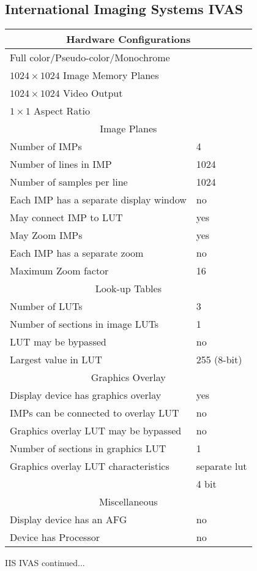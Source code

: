 \subsection{International Imaging Systems IVAS}
\begin{tabular}{|l l|}
\hline
\multicolumn{2}{|c|}{Hardware Configurations}\\
\hline
Full color/Pseudo-color/Monochrome & \\
$1024 \times 1024$ Image Memory Planes & \\
$1024 \times 1024$ Video Output & \\
$1 \times 1$ Aspect Ratio & \\ 
\hline \hline 
\multicolumn{2}{|c|}{Image Planes}\\ \hline
Number of IMPs & 4 \\
Number of lines in IMP & 1024\\
Number of samples per line & 1024\\
Each IMP has a separate display window & no\\
May connect IMP to LUT & yes\\
May Zoom IMPs & yes\\
Each IMP has a separate zoom & no\\
Maximum Zoom factor & 16\\
\hline \hline 
\multicolumn{2}{|c|}{Look-up Tables}\\ 
\hline
Number of LUTs & 3\\
Number of sections in image LUTs & 1\\
LUT may be bypassed & no\\
Largest value in LUT & 255 (8-bit)\\
\hline \hline 
\multicolumn{2}{|c|}{Graphics Overlay}\\ 
\hline
Display device has graphics overlay & yes\\
IMPs can be connected to overlay LUT & no\\
Graphics overlay LUT may be bypassed & no\\
Number of sections in graphics LUT & 1\\
Graphics overlay LUT characteristics & separate lut\\
& 4 bit\\
\hline \hline 
\multicolumn{2}{|c|}{Miscellaneous}\\ 
\hline
Display device has an AFG & no \\
Device has Processor & no\\ \hline
\end{tabular}
\newpage
IIS IVAS continued...

